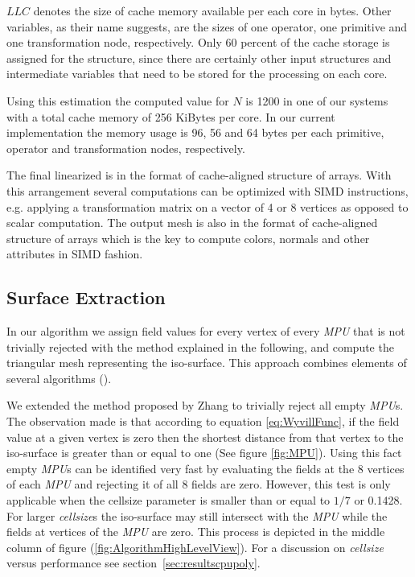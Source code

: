 $LLC$ denotes the size of cache memory available per each core in bytes. Other 
variables, as their name suggests, are the sizes of one operator, one primitive and 
one transformation node, respectively. Only 60 percent of the cache storage is assigned for 
the \blob structure, since there are certainly other input structures and intermediate variables that need 
to be stored for the processing on each core. 

Using this estimation the computed value for $N$ is 1200 in one of our systems with a total cache memory of 
256 KiBytes per core. In our current implementation the memory usage is 96, 56 and 64 bytes per each 
primitive, operator and transformation nodes, respectively. 

The final linearized \blob is in the format of cache-aligned structure of arrays. With this arrangement several 
computations can be optimized with SIMD instructions, e.g. applying a transformation matrix on a vector of 
4 or 8 vertices as opposed to scalar computation. The output mesh is also in the format of cache-aligned 
structure of arrays which is the key to compute colors, normals and other attributes in SIMD fashion. 


\subsection{Surface Extraction}\label{sec:surfaceextraction}
In our algorithm we assign field values for every vertex of every \textit{MPU} that is not trivially rejected with the method explained in 
the following, and compute the triangular mesh representing the iso-surface. This approach combines elements of several algorithms 
(\cite{Wyvill1986, Lorensen1987, Bloomenthal1994a}).

We extended the method proposed by Zhang \etal \cite{Zhang2006} to trivially reject all empty \textit{MPU}s.
The observation made is that according to equation \ref{eq:WyvillFunc}, if the field value at a given vertex is zero then 
the shortest distance from that vertex to the iso-surface is greater than or equal to one (See figure \ref{fig:MPU}). Using 
this fact empty \textit{MPU}s can be identified very fast by evaluating the fields at the 8 vertices of each \textit{MPU} and rejecting it of all 8 
fields are zero. However, this test is only applicable when the cellsize parameter is smaller than or equal to $1/7$ or 0.1428. 
For larger \textit{cellsize}s the iso-surface may still intersect with the \textit{MPU} while the fields at vertices of the \textit{MPU} are zero. 
This process is depicted in the middle column of figure (\ref{fig:AlgorithmHighLevelView}).
For a discussion on \textit{cellsize} versus performance see section~\ref{sec:resultscpupoly}.

